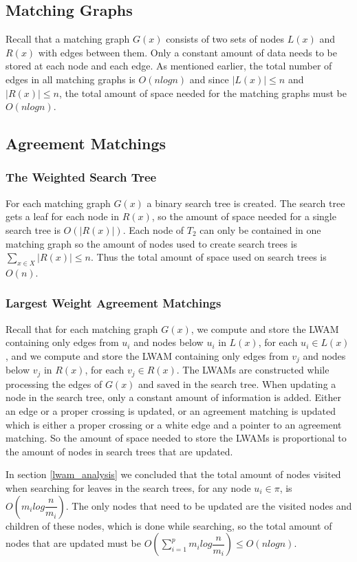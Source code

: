 \subsection{Matching Graphs}
Recall that a matching graph $G(x)$ consists of two sets of nodes $L(x)$ and $R(x)$ with edges between them. Only a constant amount of data needs to be stored at each node and each edge. As mentioned earlier, the total number of edges in all matching graphs is $O(nlogn)$ and since $|L(x)| \le n$ and $|R(x)| \le n$, the total amount of space needed for the matching graphs must be $O(nlogn)$.

\subsection{Agreement Matchings}
\subsubsection{The Weighted Search Tree}
For each matching graph $G(x)$ a binary search tree is created. The search tree gets a leaf for each node in $R(x)$, so the amount of space needed for a single search tree is $O(|R(x)|)$. Each node of $T_2$ can only be contained in one matching graph so the amount of nodes used to create search trees is $\sum_{x \in X} |R(x)| \le n$. Thus the total amount of space used on search trees is $O(n)$.

\subsubsection{Largest Weight Agreement Matchings}
Recall that for each matching graph $G(x)$, we compute and store the LWAM containing only edges from $u_i$ and nodes below $u_i$ in $L(x)$, for each $u_i \in L(x)$, and we compute and store the LWAM containing only edges from $v_j$ and nodes below $v_j$ in $R(x)$, for each $v_j \in R(x)$. The LWAMs are constructed while processing the edges of $G(x)$ and saved in the search tree. When updating a node in the search tree, only a constant amount of information is added. Either an edge or a proper crossing is updated, or an agreement matching is updated which is either a proper crossing or a white edge and a pointer to an agreement matching. So the amount of space needed to store the LWAMs is proportional to the amount of nodes in search trees that are updated.

In section \ref{lwam_analysis} we concluded that the total amount of nodes visited when searching for leaves in the search trees, for any node $u_i \in \pi$, is $O(m_ilog\dfrac{n}{m_i})$. The only nodes that need to be updated are the visited nodes and children of these nodes, which is done while searching, so the total amount of nodes that are updated must be $O(\sum_{i=1}^p m_ilog\dfrac{n}{m_i}) \le O(nlogn)$.

